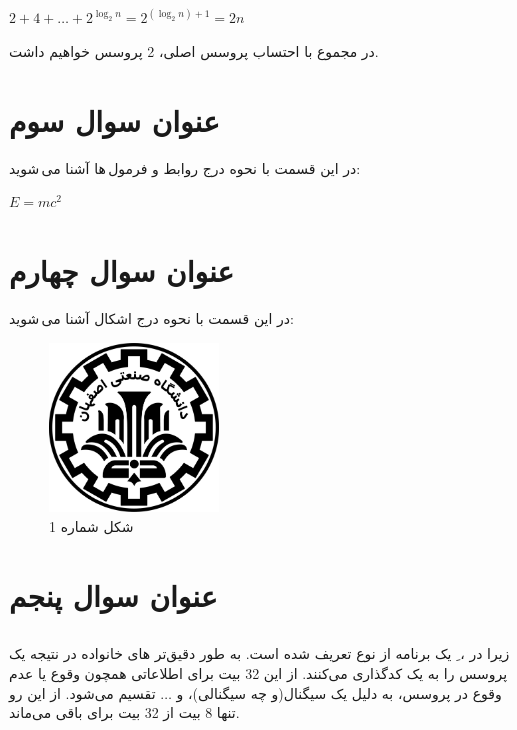 \documentclass{article}
\begin{document}
\begin{center}
$
2+4+\ldots+2^{\log_2 n}=2^{(\log_2 n)+1}=2n
$
\end{center}
در مجموع با احتساب پروسس  اصلی، 2 پروسس خواهیم داشت.

\section{عنوان سوال سوم}
در این قسمت با نحوه درج روابط و فرمول\,ها آشنا می\,شوید:
\begin{center}
$E = m{c}^{2}$
\end{center}

\section{عنوان سوال چهارم}
در این قسمت با نحوه درج اشکال آشنا می\,شوید:
\begin{figure}[H]
    \centering
    \includegraphics[width=0.4\textwidth]{IUT Logo.png}
    \caption{شکل شماره 1}
    \label{fig:fig1}
\end{figure}

\section{عنوان سوال پنجم}
\subsection{}
\lr{}

\subsection{}
زیرا در ، ِ یک برنامه از نوع  تعریف شده است. به طور دقیق‌تر های خانواده  در  نتیجه یک پروسس را به یک  کدگذاری می‌کنند. از این 32 بیت برای اطلاعاتی همچون وقوع یا عدم وقوع  در پروسس،  به دلیل یک سیگنال(و چه سیگنالی)، و $\ldots$ تقسیم می‌شود. از این رو تنها 8 بیت از 32 بیت برای  باقی می‌ماند.
\end{document}
